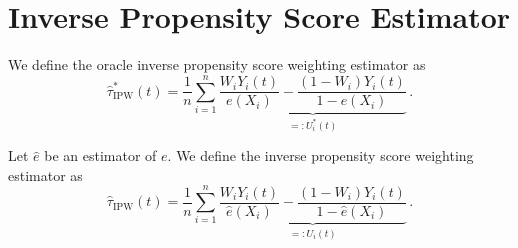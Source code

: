 \section{Inverse Propensity Score Estimator}


\begin{definition}\label{def:IpwOracleEstimator}
    We define the oracle inverse propensity score weighting estimator as
    \[
        \hat{\tau}_{\text{IPW}}^\ast(t) = \frac{1}{n} \sum_{i=1}^n
        \underbrace{
            \frac{W_i Y_i(t)}{e(X_i)} - \frac{(1 - W_i) Y_i(t)}{1 - e(X_i)}
        }_{=:U_i^\ast(t)} \,.
    \]
\end{definition}

\begin{definition}\label{def:IpwEstimator}
    Let $\hat{e}$ be an estimator of $e$. We define the inverse propensity score weighting estimator
    as
    \[
        \hat{\tau}_{\text{IPW}}(t) = \frac{1}{n} \sum_{i=1}^n
        \underbrace{
            \frac{W_i Y_i(t)}{\hat{e}(X_i)} - \frac{(1 - W_i) Y_i(t)}{1 - \hat{e}(X_i)}
        }_{=:U_i(t)} \,.
    \]
\end{definition}

